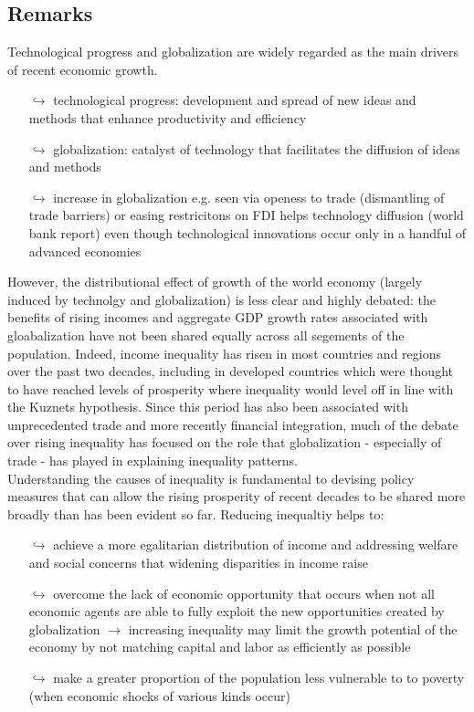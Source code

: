 \subsection{Remarks}
Technological progress and globalization are widely regarded as the main drivers of recent economic growth.
\begin{itemize}
\item[$\hookrightarrow$] technological progress: development and spread of new ideas and methods that enhance productivity and efficiency
\item[$\hookrightarrow$] globalization: catalyst of technology that facilitates the diffusion of ideas and methods
\item[$\hookrightarrow$] increase in globalization e.g. seen via  openess to trade (dismantling of trade barriers) or easing restricitons on FDI helps technology diffusion (world bank report) even though technological innovations occur only in a handful of advanced economies
\end{itemize}
However, the distributional effect of growth of the world economy (largely induced by technolgy and globalization) is less clear and highly debated: the benefits of rising incomes and aggregate GDP growth rates associated with gloabalization have not been shared equally across all segements of the population. Indeed, income inequality has risen in most countries and regions over the past two decades, including in developed countries which were thought to have reached levels of prosperity where inequality would level off in line with the Kuznets hypothesis. Since this period has also been associated with unprecedented trade and more recently financial integration, much of the debate over rising inequality has focused on the role that globalization - especially of trade - has played in explaining inequality patterns.\\
Understanding the causes of inequality is fundamental to devising policy measures that can allow the rising prosperity of recent decades to be shared more broadly than has been evident so far. Reducing inequaltiy helps to:
\begin{itemize}
\item[$\hookrightarrow$] achieve a more egalitarian distribution of income and addressing welfare and social concerns that widening disparities in income raise
\item[$\hookrightarrow$] overcome the lack of economic opportunity that occurs when not all economic agents are able to fully exploit the new opportunities created by globalization $\rightarrow$ increasing inequality may limit the growth potential of the economy by not matching capital and labor as efficiently as possible
\item[$\hookrightarrow$] make a greater proportion of the population less vulnerable to to poverty (when economic shocks of various kinds occur)
\end{itemize}
%
%
%
%
%
\clearpage